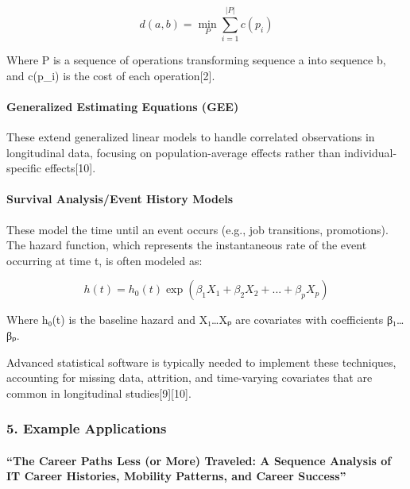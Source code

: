 \documentclass[./main.tex]{subfiles}
\begin{document}
\[ d(a,b) = \min_P \sum_{i=1}^{|P|} c(p_i) \]

Where P is a sequence of operations transforming sequence a into
sequence b, and c(p\_i) is the cost of each operation{[}2{]}.

\paragraph{Generalized Estimating Equations
(GEE)}\label{generalized-estimating-equations-gee}

These extend generalized linear models to handle correlated observations
in longitudinal data, focusing on population-average effects rather than
individual-specific effects{[}10{]}.

\paragraph{Survival Analysis/Event History
Models}\label{survival-analysisevent-history-models}

These model the time until an event occurs (e.g., job transitions,
promotions). The hazard function, which represents the instantaneous
rate of the event occurring at time t, is often modeled as:

\[ h(t) = h_0(t) \exp(\beta_1 X_1 + \beta_2 X_2 + ... + \beta_p X_p) \]

Where h₀(t) is the baseline hazard and X₁\ldots Xₚ are covariates with
coefficients β₁\ldots βₚ.

Advanced statistical software is typically needed to implement these
techniques, accounting for missing data, attrition, and time-varying
covariates that are common in longitudinal studies{[}9{]}{[}10{]}.

\subsubsection{5. Example Applications}\label{example-applications}

\paragraph{``The Career Paths Less (or More) Traveled: A Sequence
Analysis of IT Career Histories, Mobility Patterns, and Career
Success''}\label{the-career-paths-less-or-more-traveled-a-sequence-analysis-of-it-career-histories-mobility-patterns-and-career-success}
\end{document}
